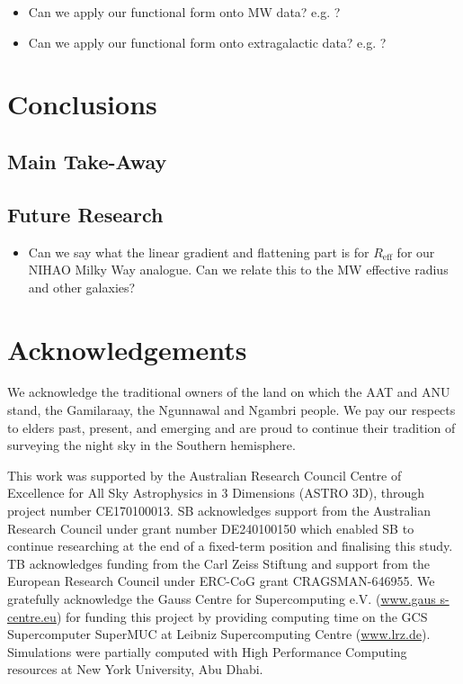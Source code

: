 \documentclass[fleqn,usenatbib]{mnras}
\begin{document}
\begin{itemize}
    \item Can we apply our functional form onto MW data? e.g. \citet{Genovali2014}?
    \item Can we apply our functional form onto extragalactic data? e.g. \citet{Chen2023}?
\end{itemize}

\section{Conclusions}
\label{sec:conc}

\subsection{Main Take-Away}

\subsection{Future Research}

\begin{itemize}
    \item Can we say what the linear gradient and flattening part is for $R_\text{eff}$ for our NIHAO Milky Way analogue. Can we relate this to the MW effective radius and other galaxies?
\end{itemize}

\section*{Acknowledgements}

We acknowledge the traditional owners of the land on which the AAT and ANU stand, the Gamilaraay, the Ngunnawal and Ngambri people. We pay our respects to elders past, present, and emerging and are proud to continue their tradition of surveying the night sky in the Southern hemisphere.

This work was supported by the Australian Research Council Centre of Excellence for All Sky Astrophysics in 3 Dimensions (ASTRO 3D), through project number CE170100013. SB acknowledges support from the Australian Research Council under grant number DE240100150 which enabled SB to continue researching at the end of a fixed-term position and finalising this study. TB acknowledges funding from the Carl Zeiss Stiftung and support from the European Research Council under ERC-CoG grant CRAGSMAN-646955. We gratefully acknowledge the Gauss Centre for Supercomputing e.V. (\url{www.gaus s-centre.eu}) for funding this project by providing computing time on the GCS Supercomputer SuperMUC at Leibniz Supercomputing Centre (\url{www.lrz.de}). Simulations were partially computed with High Performance Computing resources at New York University, Abu Dhabi.
\end{document}
